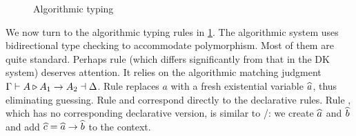 \begin{figure}[t]
  \centering
  \begin{small}
  \end{small}
  \caption{Algorithmic typing}
  \label{fig:algo:typing}
\end{figure}

We now turn to the algorithmic typing rules in \cref{fig:algo:typing}. The
algorithmic system uses bidirectional type checking to accommodate polymorphism.
Most of them are quite standard.
Perhaps rule  (which differs significantly from that in the DK system)
deserves attention. It relies on the algorithmic matching judgment $\Gamma
\vdash A \triangleright A_1 \to A_2 \dashv \Delta$.
Rule
 replaces $a$ with a fresh existential variable $\widehat{a}$, thus
eliminating guessing. Rule  and  correspond
directly to the declarative rules.
Rule , which has no
corresponding declarative version, is similar to /:
we create $\widehat{a}$ and $\widehat{b}$ and add $\widehat{c} = \widehat{a} \to \widehat{b}$ to the context.

